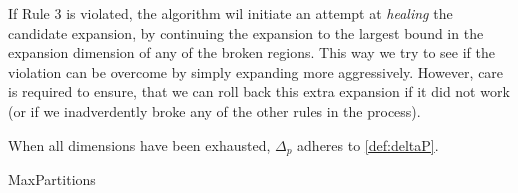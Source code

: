 If Rule 3 is violated, the algorithm wil initiate an attempt at \textit{healing}
the candidate expansion, by continuing the expansion to the largest bound in
the expansion dimension of any of the broken regions. This way we try to see if
the violation can be overcome by simply expanding more aggressively. However,
care is required to ensure, that we can roll back this extra expansion if it did
not work (or if we inadverdently broke any of the other rules in the process).

When all dimensions have been
exhausted, $\Delta_{p}$ adheres to \cref{def:deltaP}.

\begin{algorithm}[!ht]
    \caption{MaxPartitions}\label{alg:MaxPartitions}

    \begin{algorithmic}[1]




            \item[]



                \item[]


\end{algorithmic}
\end{algorithm}
